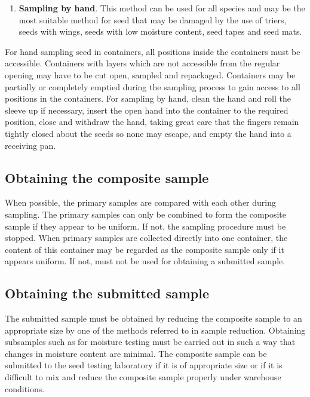\documentclass[
]{book}
\providecommand{\tightlist}{%
  \setlength{\itemsep}{0pt}\setlength{\parskip}{0pt}}
\begin{document}
\begin{enumerate}
\def\labelenumi{\alph{enumi}.}
\setcounter{enumi}{3}
\tightlist
\item
  \textbf{Sampling by hand}. This method can be used for all species and may be the most suitable method for seed that may be damaged by the use of triers, seeds with wings, seeds with low moisture content, seed tapes and seed mats.
\end{enumerate}

For hand sampling seed in containers, all positions inside the containers must be accessible. Containers with layers which are not accessible from the regular opening may have to be cut open, sampled and repackaged. Containers may be partially or completely emptied during the sampling process to gain access to all positions in the containers. For sampling by hand, clean the hand and roll the sleeve up if necessary, insert the open hand into the container to the required position, close and withdraw the hand, taking great care that the fingers remain tightly closed about the seeds so none may escape, and empty the hand into a receiving pan.

\hypertarget{obtaining-the-composite-sample}{%
\subsection{Obtaining the composite sample}\label{obtaining-the-composite-sample}}

When possible, the primary samples are compared with each other during sampling. The primary samples can only be combined to form the composite sample if they appear to be uniform. If not, the sampling procedure must be stopped. When primary samples are collected directly into one container, the content of this container may be regarded as the composite sample only if it appears uniform. If not, must not be used for obtaining a submitted sample.

\hypertarget{obtaining-the-submitted-sample}{%
\subsection{Obtaining the submitted sample}\label{obtaining-the-submitted-sample}}

The submitted sample must be obtained by reducing the composite sample to an appropriate size by one of the methods referred to in sample reduction. Obtaining subsamples such as for moisture testing must be carried out in such a way that changes in moisture content are minimal. The composite sample can be submitted to the seed testing laboratory if it is of appropriate size or if it is difficult to mix and reduce the composite sample properly under warehouse conditions.
\end{document}
